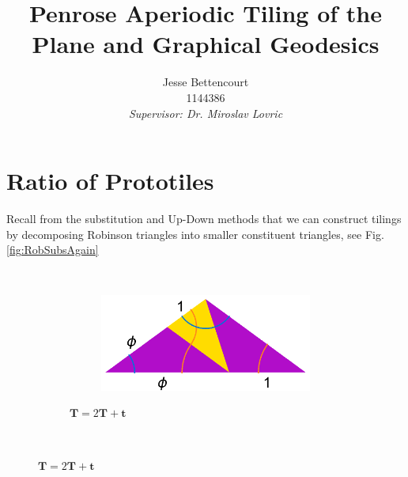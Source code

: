 \documentclass[
  oneside,
  11pt, a4paper,
  footinclude=true,
  headinclude=true,
  cleardoublepage=empty
]{scrbook}
\title{Penrose Aperiodic Tiling of the Plane and Graphical Geodesics}
\author{Jesse Bettencourt\\1144386\\[80pt]  \textit{Supervisor: Dr. Miroslav Lovric}}
\begin{document}
\section{Ratio of Prototiles}
Recall from the substitution and Up-Down methods that we can construct tilings by decomposing Robinson triangles into smaller constituent triangles, see Fig.\ref{fig:RobSubsAgain}


\begin{figure}[H]
        \centering
        \begin{subfigure}[t]{\textwidth}
        \begin{subfigure}[t]{0.4\textwidth}
                \centering
        \end{subfigure}\hfill \raisebox{30px}{\huge$\rightarrow$} \hfill%
        ~ %
        \begin{subfigure}[t]{0.4\textwidth}
                \centering
                \includegraphics[scale=0.4]{RobFatSub}
        \end{subfigure}
        \caption*{$\textbf{T}=2\textbf{T}+\textbf{t}$}
        \label{fig:RobSubThickAgain}
        \end{subfigure}
        ~ %
          

\end{figure}
\end{document}
